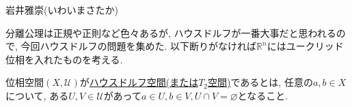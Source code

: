 \documentclass[dvipdfmx,a4paper,11pt]{article}
\newcommand{\R}{\mathbb{R}}
\theoremstyle{definition}
\begin{document}
\begin{flushright}
 岩井雅崇(いわいまさたか)
\end{flushright}

分離公理は正規や正則など色々あるが, ハウスドルフが一番大事だと思われるので, 今回ハウスドルフの問題を集めた. 以下断りがなければ$\R^{n}$にはユークリッド位相を入れたものを考える. 


  \begin{tcolorbox}[
   colback = white,
   colframe = green!35!black,
    fonttitle = \bfseries,
    breakable = true]

位相空間$(X, \mathscr{U})$が\underline{ハウスドルフ空間(または$T_2$空間)}であるとは, 任意の$a, b \in X$について, ある$U, V \in \mathscr{U}$があって$a \in U, b \in V, U \cap V = \varnothing $となること.

 \end{tcolorbox}
\end{document}

